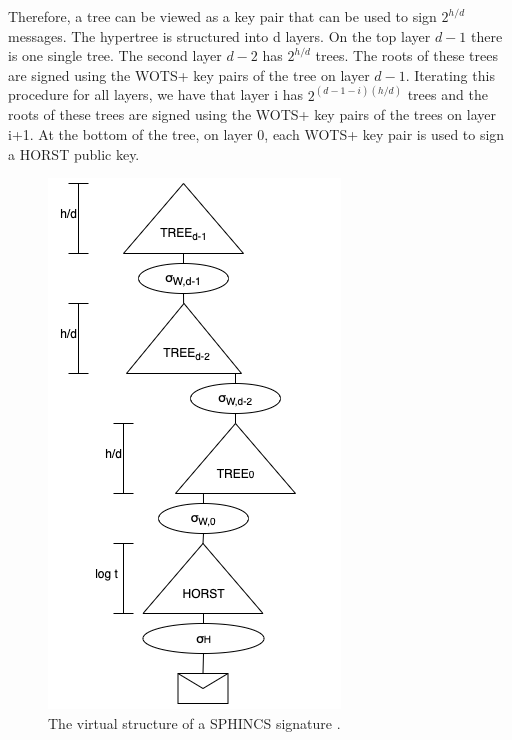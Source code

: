 \documentclass[a4paper,12pt]{article}
\begin{document}
Therefore, a tree can be viewed as a key pair that can be used to sign $2^{h/d}$ messages. The hypertree is structured into d layers. On the top layer $d-1$ there is one single tree. The second layer $d-2$ has $2^{h/d}$ trees.
The roots of these trees are signed using the WOTS+ key pairs of the tree on layer $d-1$. Iterating this procedure for all layers, we have that layer i has $2^{(d-1-i)(h/d)}$ trees and the roots of these trees are signed using the WOTS+ key pairs of the trees on layer i+1.
At the bottom of the tree, on layer 0, each WOTS+ key pair is used to sign a HORST public key.

\begin{figure}
\centerline{\includegraphics[scale=0.6]{img/sphincs.png}}
\caption{The virtual structure of a SPHINCS signature \cite{1_sphincspaper}.}
\label{fig:sphincs}
\end{figure}
\end{document}
